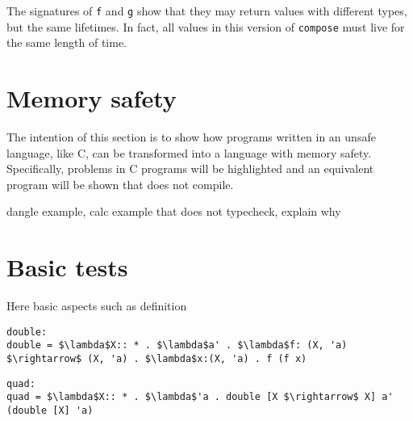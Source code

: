 The signatures of \lstinline{f} and \lstinline{g} show that they may return
values with different types, but the same lifetimes. In fact, all values in
this version of \lstinline{compose} must live for the same length of time.


\section{Memory safety}
The intention of this section is to show how programs written in an unsafe
language, like C, can be transformed into a language with memory safety. 
Specifically, problems in C programs will be highlighted and an equivalent
program will be shown that does not compile.

dangle example, calc example that does not typecheck, explain why
\section{Basic tests}
Here basic aspects such as definition

\begin{lstlisting}[mathescape, caption={Double Function application}, label={lst:double}]
double: 
double = $\lambda$X:: * . $\lambda$a' . $\lambda$f: (X, 'a) $\rightarrow$ (X, 'a) . $\lambda$x:(X, 'a) . f (f x)
\end{lstlisting}

\begin{lstlisting}[mathescape, caption={Quadruple application function using double}, label={lst:quad}]
quad: 
quad = $\lambda$X:: * . $\lambda$'a . double [X $\rightarrow$ X] a' (double [X] 'a)
\end{lstlisting}
